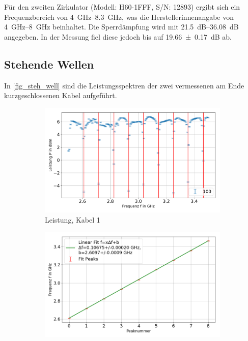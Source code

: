 \documentclass[
	a4paper,
	12pt,
	pagesize,
	ngerman
]{scrartcl}
\begin{document}
	Für den zweiten Zirkulator (Modell: H60-1FFF, S/N: 12893) ergibt sich ein Frequenzbereich von \SIrange{4}{8,3}{\giga \hertz}, was die Herstellerinnenangabe von \SIrange{4}{8}{\giga \hertz} beinhaltet.
	Die Sperrdämpfung wird mit \SIrange{21,5}{36,08}{dB} angegeben.
	In der Messung fiel diese jedoch bis auf \SI{19,66 \pm 0,17}{dB} ab.

	\subsection{Stehende Wellen}
	In \cref{fig_steh_well} sind die Leistungsspektren der zwei vermessenen am Ende kurzgeschlossenen Kabel aufgeführt.

	\begin{figure}[H]
        \centering
        \begin{subfigure}[b]{0.495\textwidth}
            \centering
            \includegraphics[width=\textwidth]{img/100}
            \caption%
            {Leistung, Kabel 1}
            \label{fig_leistung_100}
        \end{subfigure}
        \hfill
        \begin{subfigure}[b]{0.495\textwidth}
            \centering
            \includegraphics[width=\textwidth]{img/100_fit}

\end{subfigure}
\end{figure}
\end{document}
